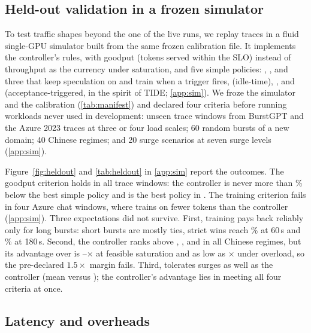 \subsection{Held-out validation in a frozen simulator}\label{sec:heldout}

To test traffic shapes beyond the one of the live runs, we replay traces in a fluid single-GPU simulator built from the same frozen calibration file. It implements the controller's rules, with goodput (tokens served within the SLO) instead of throughput as the currency under saturation, and five simple policies: , , and three that keep speculation on and train when a trigger fires,  (idle-time), , and  (acceptance-triggered, in the spirit of TIDE; \cref{app:sim}). We froze the simulator and the calibration (\cref{tab:manifest}) and declared four criteria before running workloads never used in development:  unseen trace windows from BurstGPT \citep{wang2024burstgpt} and the Azure 2023 traces \citep{patel2024splitwise} at three or four load scales; 60 random bursts of a new domain; 40 Chinese regimes; and 20 surge scenarios at seven surge levels (\cref{app:sim}).

Figure~\ref{fig:heldout} and \cref{tab:heldout} in \cref{app:sim} report the outcomes. The goodput criterion holds in all  trace windows: the controller is never more than \% below the best simple policy and is the best policy in . The training criterion fails in four Azure chat windows, where  trains on fewer tokens than the controller (\cref{app:sim}). Three expectations did not survive. First, training pays back reliably only for long bursts: short bursts are mostly ties, strict wins reach \% at 60\,s and \% at 180\,s. Second, the controller ranks above , , and  in all  Chinese regimes, but its advantage over  is --$\times$ at feasible saturation and as low as $\times$ under overload, so the pre-declared $1.5\times$ margin fails. Third,  tolerates surges as well as the controller (mean  versus ); the controller's advantage lies in meeting all four criteria at once.

\subsection{Latency and overheads}\label{sec:overheads}\label{sec:latency}

